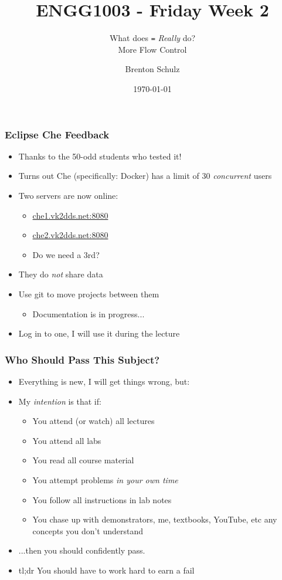 \documentclass[14pt]{beamer}
\title{ENGG1003 - Friday Week 2}
\subtitle{What does \texttt{=} \textit{Really} do?\\More Flow Control}
\author{Brenton Schulz}
\institute{University of Newcastle}
\date{\today}
\begin{document}
\titlepage

\begin{frame}
\frametitle{Eclipse Che Feedback}
\begin{itemize}
\item Thanks to the 50-odd students who tested it!
\item Turns out Che (specifically: Docker) has a limit of 30 \textit{concurrent} users
\item Two servers are now online:
	\begin{itemize}
		\item \url{che1.vk2dds.net:8080}
		\item \url{che2.vk2dds.net:8080}
		\item Do we need a 3rd?
	\end{itemize}
\item They do \textit{not} share data
\item Use git to move projects between them
	\begin{itemize}
		\item Documentation is in progress...
	\end{itemize}
\item Log in to one, I will use it during the lecture
\end{itemize}
\end{frame}

\begin{frame}
\frametitle{Who Should Pass This Subject?}
\begin{itemize}
\item Everything is new, I will get things wrong, but:
\item My \textit{intention} is that if:
	\begin{itemize}
		\item You attend (or watch) all lectures
		\item You attend all labs
		\item You read all course material
		\item You attempt problems \textit{in your own time}
		\item You follow all instructions in lab notes
		\item You chase up with demonstrators, me, textbooks, YouTube, etc any concepts you don't understand
	\end{itemize}
\item ...then you should confidently pass.
\item tl;dr You should have to work hard to earn a fail
\end{itemize}
\end{frame}
\end{document}
